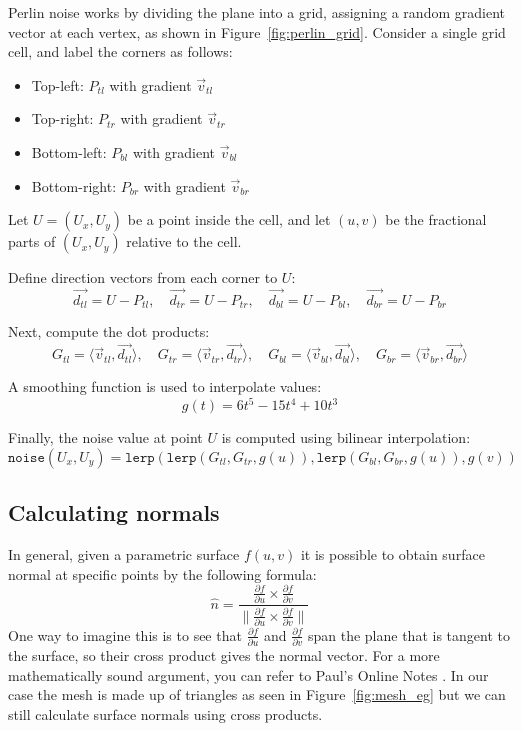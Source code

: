 Perlin noise works by dividing the plane into a grid, assigning a random gradient vector at each vertex, as shown in Figure~\ref{fig:perlin_grid}. Consider a single grid cell, and label the corners as follows:
\begin{itemize}
\item{Top-left: $P_{tl}$ with gradient $\vec{v}_{tl}$}
\item{Top-right: $P_{tr}$ with gradient $\vec{v}_{tr}$}
\item{Bottom-left: $P_{bl}$ with gradient $\vec{v}_{bl}$}
\item{Bottom-right: $P_{br}$ with gradient $\vec{v}_{br}$}
\end{itemize}

Let $U = (U_x, U_y)$ be a point inside the cell, and let $(u, v)$ be the fractional parts of $(U_x, U_y)$ relative to the cell.

Define direction vectors from each corner to $U$:
\[
\vec{d_{tl}} = U - P_{tl}, \quad \vec{d_{tr}} = U - P_{tr}, \quad \vec{d_{bl}} = U - P_{bl}, \quad \vec{d_{br}} = U - P_{br}
\]

Next, compute the dot products:
\[
G_{tl} = \langle \vec{v}_{tl}, \vec{d_{tl}} \rangle, \quad G_{tr} = \langle \vec{v}_{tr}, \vec{d_{tr}} \rangle, \quad G_{bl} = \langle \vec{v}_{bl}, \vec{d_{bl}} \rangle, \quad G_{br} = \langle \vec{v}_{br}, \vec{d_{br}} \rangle
\]

A smoothing function is used to interpolate values:
\[
g(t) = 6t^5 - 15t^4 + 10t^3
\]

Finally, the noise value at point $U$ is computed using bilinear interpolation:
\[
\texttt{noise}(U_x, U_y) = \texttt{lerp}(\texttt{lerp}(G_{tl}, G_{tr}, g(u)), \texttt{lerp}(G_{bl}, G_{br}, g(u)), g(v))
\]

\subsection{Calculating normals}
In general, given a parametric surface $f(u, v)$ it is possible to obtain surface normal at specific points by the following formula: 
\[ \hat{n} = \frac{\frac{\partial{f}}{\partial{u}} \times \frac{\partial{f}}{\partial{v}}}
{\|\frac{\partial{f}}{\partial{u}} \times \frac{\partial{f}}{\partial{v}}\|}
\]
One way to imagine this is to see that $\frac{\partial{f}}{\partial{u}}$ and $\frac{\partial{f}}{\partial{v}}$ span the plane that is tangent to the surface, so their cross product gives the normal vector. For a more mathematically sound argument, you can refer to Paul's Online Notes \cite{dawkins_parametric_surfaces}.
In our case the mesh is made up of triangles as seen in Figure~\ref{fig:mesh_eg} but we can still calculate surface normals using cross products.

